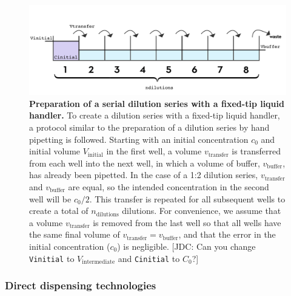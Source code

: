 \documentclass[aps,pre,twocolumn,nofootinbib,superscriptaddress,linenumbers]{revtex4-1}
\begin{document}

\begin{figure}[tb]
    \includegraphics[width=\columnwidth]{../figures/dilution.pdf}

  \caption{{\bf Preparation of a serial dilution series with a fixed-tip liquid handler.}
  To create a dilution series with a fixed-tip liquid handler, a protocol similar to the preparation of a dilution series by hand pipetting is followed.
  Starting with an initial concentration $c_0$ and initial volume $V_\mathrm{initial}$ in the first well, a volume $v_\mathrm{transfer}$ is transferred from each well into the next well, in which a volume of buffer, $v_\mathrm{buffer}$, has already been pipetted. 
  In the case of a 1:2 dilution series, $v_\mathrm{transfer}$ and $v_\mathrm{buffer}$ are equal, so the intended concentration in the second well will be $c_0/2$. 
  This transfer is repeated for all subsequent wells to create a total of $n_\mathrm{dilutions}$ dilutions. 
  For convenience, we assume that a volume $v_\mathrm{transfer}$ is removed from the last well so that all wells have the same final volume of $v_\mathrm{transfer} = v_\mathrm{buffer}$, and that the error in the initial concentration ($c_0$) is negligible.
  {\color{red}[JDC: Can you change {\tt Vinitial} to $V_\mathrm{intermediate}$ and {\tt Cinitial} to $C_0$?]}
  }
  \label{fig:dilution}
\end{figure}

\subsubsection*{Direct dispensing technologies}
\end{document}
